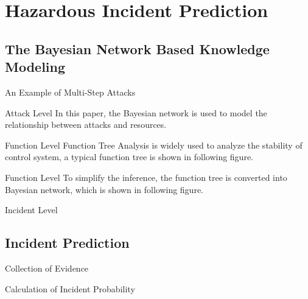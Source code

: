 \section{Hazardous Incident Prediction}
\subsection{The Bayesian Network Based Knowledge Modeling}
\begin{frame}{An Example of Multi-Step Attacks}

\end{frame}

\begin{frame}{Attack Level}
    In this paper, the Bayesian network is used to model the relationship between attacks and resources.
    \begin{center}
      
    \end{center}

\end{frame}

\begin{frame}{Function Level}
    Function Tree Analysis is widely used to analyze the stability of control system, a typical function tree is shown in following figure.
    \begin{center}
      
    \end{center}
    
    \begin{overlayarea}{\textwidth}{1cm}
    \end{overlayarea}
\end{frame}

\begin{frame}{Function Level}
    To simplify the inference, the function tree is converted into Bayesian network, which is shown in following figure.\\
    \begin{overlayarea}{\textwidth}{6cm}
    \begin{center}
    \end{center}
    \end{overlayarea}
\end{frame}

\begin{frame}{Incident Level}
\end{frame}

\subsection{Incident Prediction}
\begin{frame}{Collection of Evidence}
\end{frame}

\begin{frame}{Calculation of Incident Probability}
\end{frame} 